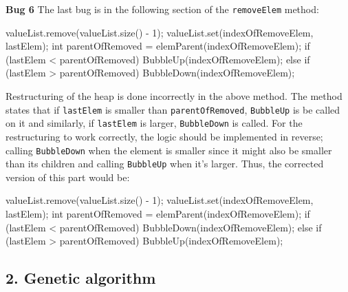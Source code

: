 \documentclass[11pt]{article}
\begin{document}
\hfill\begin{minipage}{\dimexpr\textwidth-0.5cm}
\textbf{Bug 6}
\newline
The last bug is in the following section of the \verb/removeElem/ method:
\begin{javacode}
    valueList.remove(valueList.size() - 1);
    valueList.set(indexOfRemoveElem, lastElem);
    int parentOfRemoved = elemParent(indexOfRemoveElem);
    if (lastElem < parentOfRemoved) {
        BubbleUp(indexOfRemoveElem);
    } else if (lastElem > parentOfRemoved) {
        BubbleDown(indexOfRemoveElem);
    }
\end{javacode}
Restructuring of the heap is done incorrectly in the above method. The method states that if \verb/lastElem/ is smaller than \verb/parentOfRemoved/, \verb/BubbleUp/ is be called on it and similarly, if \verb/lastElem/ is larger, \verb/BubbleDown/ is called. For the restructuring to work correctly, the logic should be implemented in reverse; calling \verb/BubbleDown/ when the element is smaller since it might also be smaller than its children and calling \verb/BubbleUp/ when it's larger. Thus, the corrected version of this part would be:
\begin{javacode}
    valueList.remove(valueList.size() - 1);
    valueList.set(indexOfRemoveElem, lastElem);
    int parentOfRemoved = elemParent(indexOfRemoveElem);
    if (lastElem < parentOfRemoved) {
        BubbleDown(indexOfRemoveElem);
    } else if (lastElem > parentOfRemoved) {
        BubbleUp(indexOfRemoveElem);
    }
\end{javacode}
\end{minipage}

\subsection*{2. Genetic	algorithm}
\end{document}
